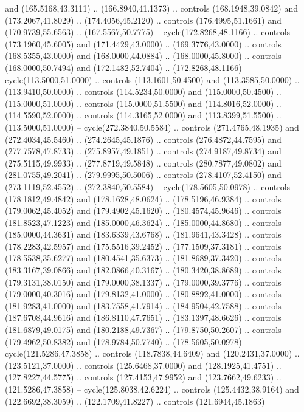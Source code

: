   and (165.5168,43.3111) .. (166.8940,41.1373) .. controls (168.1948,39.0842)
  and (173.2067,41.8029) .. (174.4056,45.2120) .. controls (176.4995,51.1661)
  and (170.9739,55.6563) .. (167.5567,50.7775) -- cycle(172.8268,48.1166) ..
  controls (173.1960,45.6005) and (171.4429,43.0000) .. (169.3776,43.0000) ..
  controls (168.5355,43.0000) and (168.0000,44.0884) .. (168.0000,45.8000) ..
  controls (168.0000,50.7494) and (172.1482,52.7404) .. (172.8268,48.1166) --
  cycle(113.5000,51.0000) .. controls (113.1601,50.4500) and (113.3585,50.0000)
  .. (113.9410,50.0000) .. controls (114.5234,50.0000) and (115.0000,50.4500) ..
  (115.0000,51.0000) .. controls (115.0000,51.5500) and (114.8016,52.0000) ..
  (114.5590,52.0000) .. controls (114.3165,52.0000) and (113.8399,51.5500) ..
  (113.5000,51.0000) -- cycle(272.3840,50.5584) .. controls (271.4765,48.1935)
  and (272.4034,45.5460) .. (274.2645,45.1876) .. controls (276.4872,44.7595)
  and (277.7578,47.8733) .. (275.8957,49.1851) .. controls (274.9187,49.8734)
  and (275.5115,49.9933) .. (277.8719,49.5848) .. controls (280.7877,49.0802)
  and (281.0755,49.2041) .. (279.9995,50.5006) .. controls (278.4107,52.4150)
  and (273.1119,52.4552) .. (272.3840,50.5584) -- cycle(178.5605,50.0978) ..
  controls (178.1812,49.4842) and (178.1628,48.0624) .. (178.5196,46.9384) ..
  controls (179.0062,45.4052) and (179.4902,45.1620) .. (180.4574,45.9646) ..
  controls (181.8523,47.1223) and (185.0000,46.3624) .. (185.0000,44.8680) ..
  controls (185.0000,44.3631) and (183.6339,43.6768) .. (181.9641,43.3428) ..
  controls (178.2283,42.5957) and (175.5516,39.2452) .. (177.1509,37.3181) ..
  controls (178.5538,35.6277) and (180.4541,35.6373) .. (181.8689,37.3420) ..
  controls (183.3167,39.0866) and (182.0866,40.3167) .. (180.3420,38.8689) ..
  controls (179.3131,38.0150) and (179.0000,38.1337) .. (179.0000,39.3776) ..
  controls (179.0000,40.3016) and (179.8132,41.0000) .. (180.8892,41.0000) ..
  controls (181.9283,41.0000) and (183.7558,41.7914) .. (184.9504,42.7588) ..
  controls (187.6708,44.9616) and (186.8110,47.7651) .. (183.1397,48.6626) ..
  controls (181.6879,49.0175) and (180.2188,49.7367) .. (179.8750,50.2607) ..
  controls (179.4962,50.8382) and (178.9784,50.7740) .. (178.5605,50.0978) --
  cycle(121.5286,47.3858) .. controls (118.7838,44.6409) and (120.2431,37.0000)
  .. (123.5121,37.0000) .. controls (125.6468,37.0000) and (128.1925,41.4751) ..
  (127.8227,44.5775) .. controls (127.4153,47.9952) and (123.7662,49.6233) ..
  (121.5286,47.3858) -- cycle(125.8038,42.6224) .. controls (125.4432,38.9164)
  and (122.6692,38.3059) .. (122.1709,41.8227) .. controls (121.6944,45.1863)
